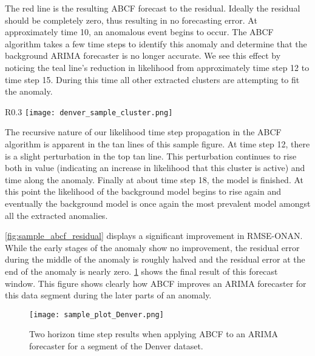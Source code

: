 The red line is the resulting ABCF forecast to the residual.  Ideally the residual should be completely zero, thus resulting in no forecasting error.  At approximately time 10, an anomalous event begins to occur.  The ABCF algorithm takes a few time steps to identify this anomaly and determine that the background ARIMA forecaster is no longer accurate.  We see this effect by noticing the teal line's reduction in likelihood from approximately time step 12 to time step 15.  During this time all other extracted clusters are attempting to fit the anomaly.

\begin{wrapfigure}{R}{0.3\textwidth}
\centering
\texttt{[image: denver\_sample\_cluster.png]}
\caption{Extracted sample clustered anomaly.}
\label{fig:sample_cluster}
\end{wrapfigure}

The recursive nature of our likelihood time step propagation in the ABCF algorithm is apparent in the tan lines of this sample figure.  At time step 12, there is a slight perturbation in the top tan line.  This perturbation continues to rise both in value (indicating an increase in likelihood that this cluster is active) and time along the anomaly.  Finally at about time step 18, the model is finished.  At this point the likelihood of the background model begins to rise again and eventually the background model is once again the most prevalent model amongst all the extracted anomalies.

\ref{fig:sample_abcf_residual} displays a significant improvement in RMSE-ONAN.  While the early stages of the anomaly show no improvement, the residual error during the middle of the anomaly is roughly halved and the residual error at the end of the anomaly is nearly zero.  \ref{fig:sample_abcf_denver} shows the final result of this forecast window.  This figure shows clearly how ABCF improves an ARIMA forecaster for this data segment during the later parts of an anomaly.

\begin{figure}[!h]
	\begin{center}
		\texttt{[image: sample\_plot\_Denver.png]}
	\end{center}
	\caption{Two horizon time step results when applying ABCF to an ARIMA forecaster for a segment of the Denver dataset.}
	\label{fig:sample_abcf_denver}
\end{figure}



